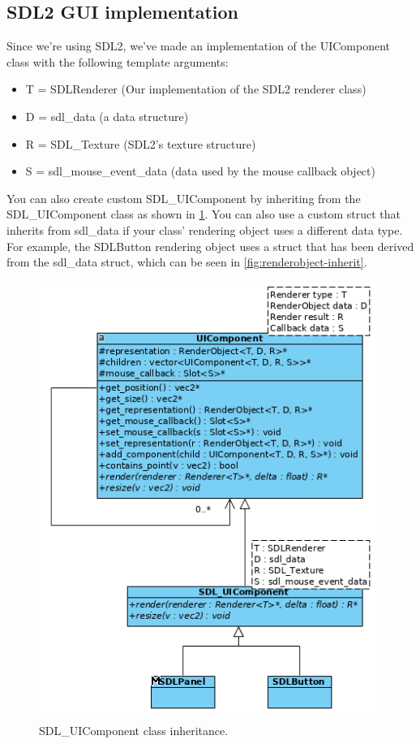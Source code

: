 \subsection{SDL2 GUI implementation}
\label{sec:sdl2gui}

Since we're using SDL2, we've made an implementation of the UIComponent class
 with the following template arguments:
\begin{itemize}
\item T = SDLRenderer (Our implementation of the SDL2 renderer class)
\item D = sdl\_data (a data structure)
\item R = SDL\_Texture (SDL2's texture structure)
\item S = sdl\_mouse\_event\_data (data used by the mouse callback object)
\end{itemize}

You can also create custom SDL\_UIComponent by inheriting from the 
SDL\_UIComponent class as shown in \cref{fig:sdluicomponent-inherit}. You can 
also use a custom struct that inherits from sdl\_data if your class' 
rendering object uses a different data type. For example, the SDLButton 
rendering object uses a struct that has been derived from the sdl\_data 
struct, which can be seen in \cref{fig:renderobject-inherit}.

\begin{figure}[H]
\centering
\includegraphics[scale=0.6]{res/ui/sdluicomponent-inherit.png}
\caption{SDL\_UIComponent class inheritance.}\label{fig:sdluicomponent-inherit}
\end{figure}
